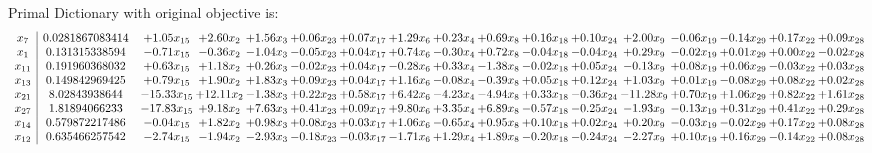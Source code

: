 \documentclass[9pt]{article}
\begin{document}
Primal Dictionary with original objective is:
\[\begin{array}{c| c c@{\hskip 2pt} c@{\hskip 2pt} c@{\hskip 2pt} c@{\hskip 2pt} c@{\hskip 2pt} c@{\hskip 2pt} c@{\hskip 2pt} c@{\hskip 2pt} c@{\hskip 2pt} c@{\hskip 2pt} c@{\hskip 2pt} c@{\hskip 2pt} c@{\hskip 2pt} c@{\hskip 2pt} c@{\hskip 2pt} }
 x_{7}   &  0.0281867083414 & +  1.05 x_{15} & +  2.60 x_{2} & +  1.56 x_{3} & +  0.06 x_{23} & +  0.07 x_{17} & +  1.29 x_{6} & +  0.23 x_{4} & +  0.69 x_{8} & +  0.16 x_{18} & +  0.10 x_{24} & +  2.00 x_{9} & -0.06 x_{19} & -0.14 x_{29} & +  0.17 x_{22} & +  0.09 x_{28}\\
 x_{1}   &  0.131315338594 & -0.71 x_{15} & -0.36 x_{2} & -1.04 x_{3} & -0.05 x_{23} & +  0.04 x_{17} & +  0.74 x_{6} & -0.30 x_{4} & +  0.72 x_{8} & -0.04 x_{18} & -0.04 x_{24} & +  0.29 x_{9} & -0.02 x_{19} & +  0.01 x_{29} & +  0.00 x_{22} & -0.02 x_{28}\\
 x_{11}   &  0.191960368032 & +  0.63 x_{15} & +  1.18 x_{2} & +  0.26 x_{3} & -0.02 x_{23} & +  0.04 x_{17} & -0.28 x_{6} & +  0.33 x_{4} & -1.38 x_{8} & -0.02 x_{18} & +  0.05 x_{24} & -0.13 x_{9} & +  0.08 x_{19} & +  0.06 x_{29} & -0.03 x_{22} & +  0.03 x_{28}\\
 x_{13}   &  0.149842969425 & +  0.79 x_{15} & +  1.90 x_{2} & +  1.83 x_{3} & +  0.09 x_{23} & +  0.04 x_{17} & +  1.16 x_{6} & -0.08 x_{4} & -0.39 x_{8} & +  0.05 x_{18} & +  0.12 x_{24} & +  1.03 x_{9} & +  0.01 x_{19} & -0.08 x_{29} & +  0.08 x_{22} & +  0.02 x_{28}\\
 x_{21}   &  8.02843938644 & -15.33 x_{15} & + 12.11 x_{2} & -1.38 x_{3} & +  0.22 x_{23} & +  0.58 x_{17} & +  6.42 x_{6} & -4.23 x_{4} & -4.94 x_{8} & +  0.33 x_{18} & -0.36 x_{24} & -11.28 x_{9} & +  0.70 x_{19} & +  1.06 x_{29} & +  0.82 x_{22} & +  1.61 x_{28}\\
 x_{27}   &  1.81894066233 & -17.83 x_{15} & +  9.18 x_{2} & +  7.63 x_{3} & +  0.41 x_{23} & +  0.09 x_{17} & +  9.80 x_{6} & +  3.35 x_{4} & +  6.89 x_{8} & -0.57 x_{18} & -0.25 x_{24} & -1.93 x_{9} & -0.13 x_{19} & +  0.31 x_{29} & +  0.41 x_{22} & +  0.29 x_{28}\\
 x_{14}   &  0.579872217486 & -0.04 x_{15} & +  1.82 x_{2} & +  0.98 x_{3} & +  0.08 x_{23} & +  0.03 x_{17} & +  1.06 x_{6} & -0.65 x_{4} & +  0.95 x_{8} & +  0.10 x_{18} & +  0.02 x_{24} & +  0.20 x_{9} & -0.03 x_{19} & -0.02 x_{29} & +  0.17 x_{22} & +  0.08 x_{28}\\
 x_{12}   &  0.635466257542 & -2.74 x_{15} & -1.94 x_{2} & -2.93 x_{3} & -0.18 x_{23} & -0.03 x_{17} & -1.71 x_{6} & +  1.29 x_{4} & +  1.89 x_{8} & -0.20 x_{18} & -0.24 x_{24} & -2.27 x_{9} & +  0.10 x_{19} & +  0.16 x_{29} & -0.14 x_{22} & +  0.08 x_{28}\\

\end{array}\]
\end{document}
